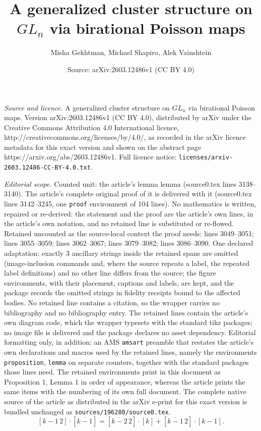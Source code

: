 \documentclass[10pt,a4paper]{amsart}
\title{A generalized cluster structure on $GL_n$ via birational Poisson maps}
\author{Misha Gekhtman, Michael Shapiro, Alek Vainshtein}
\date{Source: arXiv:2603.12486v1 (CC BY 4.0)}
\begin{document}
\maketitle

\noindent\emph{Source and licence.} A generalized cluster structure on $GL_n$ via birational Poisson maps. Version arXiv:2603.12486v1 (CC BY 4.0), distributed by arXiv under the Creative Commons Attribution 4.0 International licence, http://creativecommons.org/licenses/by/4.0/, as recorded in the arXiv licence metadata for this exact version and shown on the abstract page https://arxiv.org/abs/2603.12486v1. Full licence notice: \texttt{licenses/arxiv-2603.12486-CC-BY-4.0.txt}.\par\smallskip

\noindent\textit{Editorial scope.} Counted unit: the article's lemma lemma (source0.tex lines 3138--3140). The article's complete original proof of it is delivered with it (source0.tex lines 3142--3245, one \texttt{proof} environment of 104 lines). No mathematics is written, repaired or re-derived: the statement and the proof are the article's own lines, in the article's own notation, and no retained line is substituted or re-flowed.  Retained uncounted as the source-local context the proof needs: lines 3049--3051; lines 3055--3059; lines 3062--3067; lines 3079--3082; lines 3086--3090.  One declared adaptation: exactly 3 ancillary strings inside the retained spans are omitted (image-inclusion commands and, where the source repeats a label, the repeated label definitions) and no other line differs from the source; the figure environments, with their placement, captions and labels, are kept, and the package records the omitted strings in fidelity receipts bound to the affected bodies.  No retained line contains a citation, so the wrapper carries no bibliography and no bibliography entry.  The retained lines contain the article's own diagram code, which the wrapper typesets with the standard tikz packages; no image file is delivered and the package declares no asset dependency.  Editorial formatting only, in addition: an AMS \texttt{amsart} preamble that restates the article's own declarations and macros used by the retained lines, namely the environments \texttt{proposition}, \texttt{lemma} on separate counters, together with the standard packages those lines need.  The retained environments print in this document as Proposition 1, Lemma 1 in order of appearance, whereas the article prints the same items with the numbering of its own full document.  The complete native source of the article as distributed in the arXiv e-print for this exact version is bundled unchanged as \texttt{sources/196280/source0.tex}.
\begin{equation}\label{4pluck}
[k-1\,2]\cdot[\overline{k-1}]=[\overline{k-2}\,2]\cdot[k]+[\overline{k-1}\,2]\cdot[k-1].
\end{equation}
\end{document}
